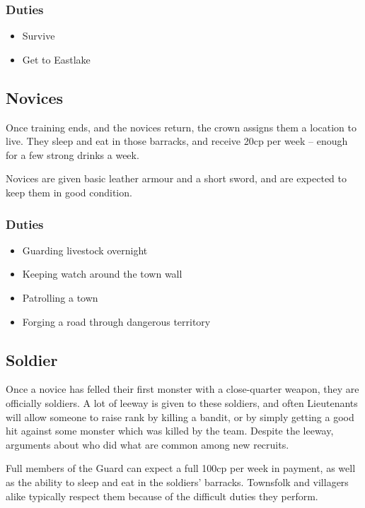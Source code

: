 \begin{multicols}{2}
\subsubsection{Duties}

\begin{itemize}
  \item{Survive}
  \item{Get to Eastlake}
\end{itemize}

\subsection{Novices}

Once training ends, and the novices return, the crown assigns them a location to live.
They sleep and eat in those barracks, and receive 20cp per week -- enough for a few strong drinks a week.

Novices are given basic leather armour and a short sword, and are expected to keep them in good condition.

\subsubsection{Duties}

\begin{itemize}
  \item{Guarding livestock overnight}
  \item{Keeping watch around the town wall}
  \item{Patrolling a town}
  \item{Forging a road through dangerous territory}
\end{itemize}

\subsection{Soldier}

Once a novice has felled their first monster with a close-quarter weapon, they are officially soldiers.
A lot of leeway is given to these soldiers, and often Lieutenants will allow someone to raise rank by killing a bandit, or by simply getting a good hit against some monster which was killed by the team.
Despite the leeway, arguments about who did what are common among new recruits.

Full members of the Guard can expect a full 100cp per week in payment, as well as the ability to sleep and eat in the soldiers' barracks.
Townsfolk and villagers alike typically respect them because of the difficult duties they perform.


\end{multicols}
